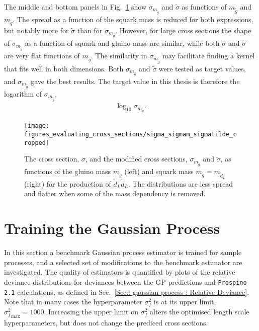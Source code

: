 \documentclass[twoside,english]{uiofysmaster}
\begin{document}
{{The middle and bottom panels in Fig.~\ref{Fig:: evaluating cross : Comparison sigma and sigma/m} show $\sigma_{m_{\widetilde{g}}}$ and $\tilde{\sigma}$ as functions of $m_{\widetilde{g}}$ and $m_{\widetilde{q}}$. The spread as a function of the squark mass is reduced for both expressions, but notably more for $\tilde{\sigma}$ than for $\sigma_{m_{\widetilde{g}}}$. However, for large cross sections the shape of $\sigma_{m_{\widetilde{g}}}$ as a function of squark and gluino mass are similar, while both $\sigma$ and $\tilde{\sigma}$ are very flat functions of $m_{\widetilde{g}}$. The similarity in $\sigma_{m_{\widetilde{g}}}$ may facilitate finding a kernel that fits well in both dimensions. Both $\sigma_{m_{\widetilde{g}}}$ and $\tilde{\sigma}$ were tested as target values, and $\sigma_{m_{\widetilde{g}}}$ gave the best results. The target value in this thesis is therefore the logarithm of $\sigma_{m_{\widetilde{g}}}$,
\begin{align}
\log_{10} \sigma_{m_{\widetilde{g}}}.
\end{align}




\begin{figure}
\texttt{[image: figures\_evaluating\_cross\_sections/sigma\_sigmam\_sigmatilde\_cropped]}
\caption{The cross section, $\sigma$, and the modified cross sections, $\sigma_{m_{\widetilde{g}}}$ and $\tilde{\sigma}$,  as functions of the gluino mass $m_{\widetilde{g}}$ (left) and squark mass $m_{\widetilde{q}} = m_{\widetilde{d}_L}$ (right) for the production of $\widetilde{d}_L \widetilde{d}_L$. The distributions are less spread and flatter when some of the mass dependency is removed.}
\label{Fig:: evaluating cross : Comparison sigma and sigma/m}
\end{figure}

\section{Training the Gaussian Process}

In this section a benchmark Gaussian process estimator is trained for sample processes, and a selected set of modifications to the benchmark estimator are investigated. The quality of estimators is quantified by plots of the relative deviance distributions for deviances between the GP predictions and \verb|Prospino 2.1| calculations, as defined in Sec.~\ref{Sec:: gaussian process : Relative Deviance}. Note that in many cases the hyperparameter $\sigma_f^2$ is at its upper limit, ${\sigma_f^2}_{\mathrm{max}} = 1000$. Increasing the upper limit on $\sigma_f^2$ alters the optimised length scale hyperparameters, but does not change the prediced cross sections. 

}}
\end{document}
